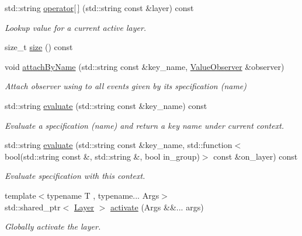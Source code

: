 \begin{DoxyCompactItemize}
\item 
std\+::string \hyperlink{classkdb_1_1Context_adbd89b28f978fb99bb5315cf7732c40f}{operator\mbox{[}$\,$\mbox{]}} (std\+::string const \&layer) const
\begin{DoxyCompactList}\small\item\em Lookup value for a current active layer. \end{DoxyCompactList}\item 
size\+\_\+t \hyperlink{classkdb_1_1Context_a2208d178203f74652a2a023b66d445fd}{size} () const
\item 
void \hyperlink{classkdb_1_1Context_afcbfe897ee36eb4fee23640051122e54}{attach\+By\+Name} (std\+::string const \&key\+\_\+name, \hyperlink{classkdb_1_1ValueObserver}{Value\+Observer} \&observer)
\begin{DoxyCompactList}\small\item\em Attach observer using to all events given by its specification (name) \end{DoxyCompactList}\item 
std\+::string \hyperlink{classkdb_1_1Context_a7cf9cda848595583ea35c8041d6466ee}{evaluate} (std\+::string const \&key\+\_\+name) const
\begin{DoxyCompactList}\small\item\em Evaluate a specification (name) and return a key name under current context. \end{DoxyCompactList}\item 
std\+::string \hyperlink{classkdb_1_1Context_a50ecf7ad3b5685f11a0bdaa65abd8f62}{evaluate} (std\+::string const \&key\+\_\+name, std\+::function$<$ bool(std\+::string const \&, std\+::string \&, bool in\+\_\+group)$>$ const \&on\+\_\+layer) const
\begin{DoxyCompactList}\small\item\em Evaluate specification with this context. \end{DoxyCompactList}\item 
{\footnotesize template$<$typename T , typename... Args$>$ }\\std\+::shared\+\_\+ptr$<$ \hyperlink{classkdb_1_1Layer}{Layer} $>$ \hyperlink{classkdb_1_1Context_ae6313bea68b242fa50817c604a67e704}{activate} (Args \&\&... args)
\begin{DoxyCompactList}\small\item\em Globally activate the layer. \end{DoxyCompactList}\end{DoxyCompactItemize}



